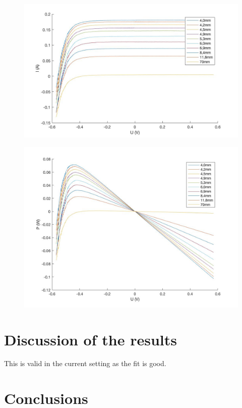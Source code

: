 \documentclass[a4paper]{article}
\begin{document}
	 \begin{figure}
		\centering
		\includegraphics[width=1.1\textwidth]{dist_U-I}
		\caption{\label{fig:data1}}
	\end{figure}
	
	\begin{figure}
		\centering
		\includegraphics[width=1.1\textwidth]{dist_U-P}
		\caption{\label{fig:data2}}
	\end{figure}

\section{Discussion of the results}

	This is valid in the current setting as the fit is good.

\section{Conclusions}
\end{document}
